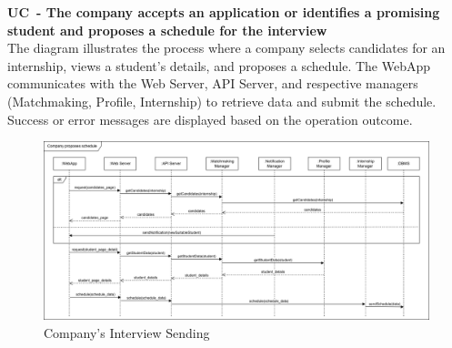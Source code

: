 \textbf{UC\cuc\  - The company accepts an application or identifies a promising student and
proposes a schedule for the interview} \\
The diagram illustrates the process where a company selects candidates for an internship, views a student's details, and proposes a schedule. The WebApp communicates with the Web Server, API Server, and respective managers (Matchmaking, Profile, Internship) to retrieve data and submit the schedule. Success or error messages are displayed based on the operation outcome.
\begin{center}
    \begin{figure}[H]
        \centering
        \includegraphics[width=1\linewidth]{Images/Sequence diagrams/UC13.png}
        \caption{Company's Interview Sending}
        \label{fig:enter-label}
    \end{figure}
\end{center}

